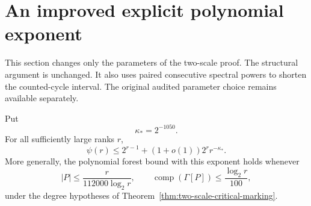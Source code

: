 \section{An improved explicit polynomial exponent}
\label{sec:two-scale-optimized-constants}

This section changes only the parameters of the two-scale proof.
The structural argument is unchanged.
It also uses paired consecutive spectral powers to shorten the counted-cycle interval.
The original audited parameter choice remains available separately.

\begin{theorem}
\label{thm:two-scale-explicit-exponent}
Put
\[
 \kappa_* = 2^{-1050}.
\]
For all sufficiently large ranks $r$,
\[
 \psi(r)\le2^{r-1}+(1+o(1))2^r r^{-\kappa_*}.
\]
More generally, the polynomial forest bound with this exponent holds whenever
\[
 |P|\le\frac{r}{112000\log_2r},\qquad
 \operatorname{comp}(\Gamma[P])\le\frac{\log_2r}{100},
\]
under the degree hypotheses of Theorem~\ref{thm:two-scale-critical-marking}.
\end{theorem}

